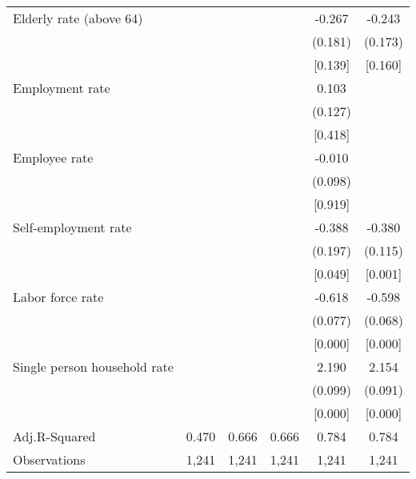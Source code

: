 {\begin{tabular}{l*{5}{c}}
Elderly rate (above 64)&            &            &            &      -0.267&      -0.243\\
                    &            &            &            &     (0.181)&     (0.173)\\
                    &            &            &            &     [0.139]&     [0.160]\\
Employment rate     &            &            &            &       0.103&            \\
                    &            &            &            &     (0.127)&            \\
                    &            &            &            &     [0.418]&            \\
Employee rate       &            &            &            &      -0.010&            \\
                    &            &            &            &     (0.098)&            \\
                    &            &            &            &     [0.919]&            \\
Self-employment rate&            &            &            &      -0.388&      -0.380\\
                    &            &            &            &     (0.197)&     (0.115)\\
                    &            &            &            &     [0.049]&     [0.001]\\
Labor force rate    &            &            &            &      -0.618&      -0.598\\
                    &            &            &            &     (0.077)&     (0.068)\\
                    &            &            &            &     [0.000]&     [0.000]\\
Single person household rate&            &            &            &       2.190&       2.154\\
                    &            &            &            &     (0.099)&     (0.091)\\
                    &            &            &            &     [0.000]&     [0.000]\\
\hline
Adj.R-Squared       &       0.470&       0.666&       0.666&       0.784&       0.784\\
Observations        &       1,241&       1,241&       1,241&       1,241&       1,241\\
\hline\hline
\end{tabular}
}
